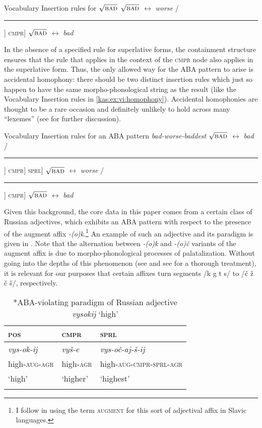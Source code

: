 \documentclass[output=paper,colorlinks,citecolor=brown]{langscibook}
\begin{document}
\ea Vocabulary Insertion rules for $\sqrt{\mbox{\textsc{bad}}}$\label{kas:ex:bad:vi}
\ea $\sqrt{\mbox{\textsc{bad}}}$ $\leftrightarrow$ \textit{worse} /\rule{4mm}{.4pt}] \textsc{cmpr}]
\ex $\sqrt{\mbox{\textsc{bad}}}$ $\leftrightarrow$ \textit{bad}
\z\z

\noindent In the absence of a specified rule for superlative forms, the containment structure ensures that the rule that applies in the context of the \textsc{cmpr} node also applies in the superlative form. Thus, the only allowed way for the ABA pattern to arise is accidental homophony: there should be two distinct insertion rules which just so happen to have the same morpho-phonological string as the result (like the Vocabulary Insertion rules in \ref{kas:ex:vi:homophony}). Accidental homophonies are thought to be a rare occasion and definitely unlikely to hold across many ``lexemes'' (see \citealt{Bobaljik:2018} for further discussion).

\ea Vocabulary Insertion rules for an ABA pattern \textit{bad-worse-baddest}\label{kas:ex:vi:homophony}
\ea $\sqrt{\mbox{\textsc{bad}}}$ $\leftrightarrow$ \textit{bad}  /\rule{4mm}{.4pt}] \textsc{cmpr}] \textsc{sprl}] 
\ex $\sqrt{\mbox{\textsc{bad}}}$ $\leftrightarrow$ \textit{worse} /\rule{4mm}{.4pt}] \textsc{cmpr}] 
\ex $\sqrt{\mbox{\textsc{bad}}}$ $\leftrightarrow$ \textit{bad} 
\z\z

\noindent Given this background, the core data in this paper comes from a certain class of Russian adjectives, which exhibits an ABA pattern with respect to the presence of the augment affix \textit{-(o)k}.\footnote{I follow \citet{VandenWyngaerd:2020} in using the term \textsc{augment} for this sort of adjectival affix in Slavic languages.} An example of such an adjective and its paradigm is given in . Note that the alternation between \textit{-(o)k} and \textit{-(o)č} variants of the augment affix is due to morpho-phonological processes of palatalization. Without going into the depths of this phenomenon (see \citealt{Blumenfeld:2003} and see \citealt{Halle:1959} for a thorough treatment), it is relevant for our purposes that certain affixes turn segments /k g t s/ to /č ž č š/, respectively.

\begin{table}
\caption{{*}ABA-violating paradigm of Russian adjective \textit{vysokij} `high'}
\label{kas:tab:intro:vysokij}
 \begin{tabularx}{.8\textwidth}{QQl} 
  \lsptoprule
        \textsc{pos}   &\textsc{cmpr}  & \textsc{sprl} \\
  \midrule
        \textit{vys-ok-ij} &\textit{vyš-e}  &\textit{vys-oč-aj-š-ij} \\
        {high-\textsc{aug-agr}} &{high-\textsc{agr}}    &{high-\textsc{aug-cmpr-sprl-agr}}  \\
        {`high'} & {`higher'}&{`highest'}\\
  \lspbottomrule
 \end{tabularx}
\end{table}
\end{document}
